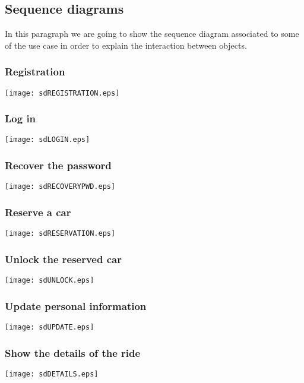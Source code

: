 \pagebreak
\subsection{Sequence diagrams}
In this paragraph we are going to show the sequence diagram associated to some of the use case in order to explain the interaction between objects.

\subsubsection{Registration}
	\centerline{
		\texttt{[image: sdREGISTRATION.eps]}}
	\pagebreak

\subsubsection{Log in}
	\centerline{
		\texttt{[image: sdLOGIN.eps]}}
	\pagebreak

\subsubsection{Recover the password}
	\centerline{
		\texttt{[image: sdRECOVERYPWD.eps]}}
	\pagebreak
	
\subsubsection{Reserve a car}
	\centerline{
		\texttt{[image: sdRESERVATION.eps]}}
	\pagebreak
	
\subsubsection{Unlock the reserved car}
	\centerline{
		\texttt{[image: sdUNLOCK.eps]}}
		\pagebreak

\subsubsection{Update personal information}
	\centerline{
		\texttt{[image: sdUPDATE.eps]}}
	\pagebreak
	
\subsubsection{Show the details of the ride}
	\centerline{
		\texttt{[image: sdDETAILS.eps]}}